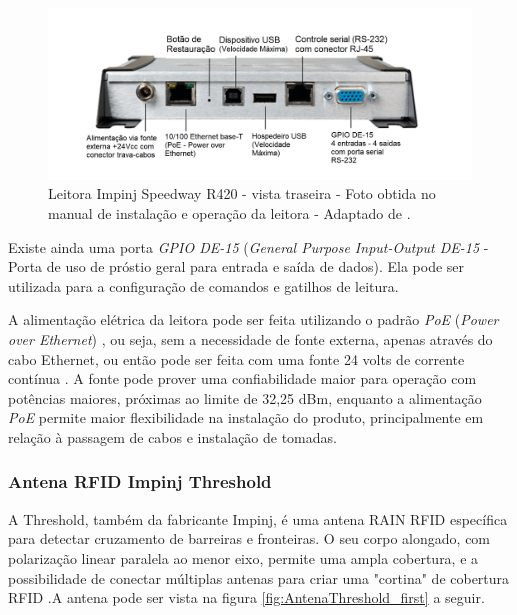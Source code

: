 \begin{figure}[h]
    \centering
    \includegraphics[width=0.9\linewidth]{figs/Metodologia/SpeedwayR420-back-view.png}
    \caption{Leitora Impinj Speedway R420 - vista traseira - Foto obtida no manual de instalação e operação da leitora - Adaptado de \cite{SpeedwayRUserManual}.}
    \label{fig:SpeedwayR420back}
\end{figure}
 
 Existe ainda uma porta \textit{GPIO DE-15} (\textit{General Purpose Input-Output DE-15} - Porta de uso de próstio geral para entrada e saída de dados)\cite{SpeedwayRUserManual}. Ela pode ser utilizada para a configuração de comandos e gatilhos de leitura.
 
 A alimentação elétrica da leitora pode ser feita utilizando o padrão \textit{PoE} (\textit{Power over Ethernet}) \cite{SpeedwayRUserManual}, ou seja, sem a necessidade de fonte externa, apenas através do cabo Ethernet, ou então pode ser feita com uma fonte 24 volts de corrente contínua \cite{IEEE-SA-POE}. A fonte pode prover uma confiabilidade maior para operação com potências maiores, próximas ao limite de 32,25 dBm, enquanto a alimentação \textit{PoE} permite maior flexibilidade na instalação do produto, principalmente em relação à passagem de cabos e instalação de tomadas.
 
 \subsubsection{Antena RFID Impinj Threshold}
 
 A Threshold, também da fabricante Impinj, é uma antena RAIN RFID específica para detectar cruzamento de barreiras e fronteiras. O seu corpo alongado, com polarização linear paralela ao menor eixo, permite uma ampla cobertura, e a possibilidade de conectar múltiplas antenas para criar uma "cortina" de cobertura RFID \cite{AntenaThresholdDatasheet}.A antena pode ser vista na figura \ref{fig:AntenaThreshold_first} a seguir.
 

